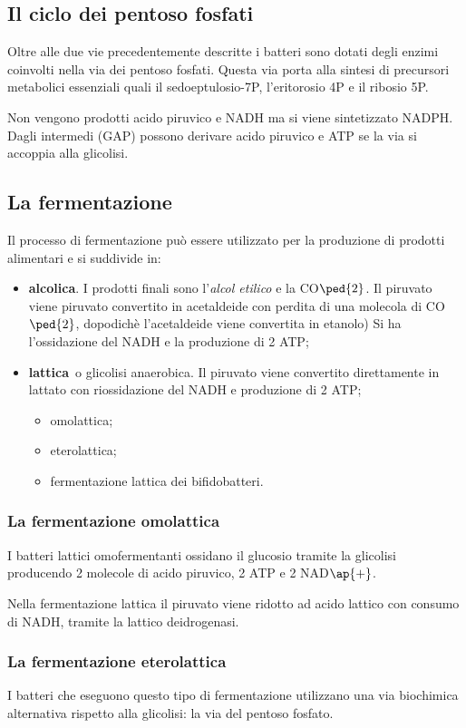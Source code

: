 \documentclass[11pt]{book}
\begin{document}
\subsection{Il ciclo dei pentoso fosfati}
Oltre alle due vie precedentemente descritte i batteri sono dotati degli enzimi coinvolti nella via dei pentoso fosfati. Questa via porta alla sintesi di precursori metabolici essenziali quali il sedoeptulosio-7P, l'eritorosio 4P e il ribosio 5P. 

Non vengono prodotti acido piruvico e NADH ma si viene sintetizzato NADPH. Dagli intermedi (GAP) possono derivare acido piruvico e ATP se la via si accoppia alla glicolisi.


\subsection{La fermentazione}
Il processo di fermentazione può essere utilizzato per la produzione di prodotti alimentari e si suddivide in: 
\begin{itemize}
\item \textbf{alcolica}. I prodotti finali sono l'\emph{alcol etilico} e  la CO$\ped{2}$. Il piruvato viene piruvato convertito in acetaldeide con perdita di una molecola di CO$\ped{2}$, dopodichè l'acetaldeide viene convertita in etanolo) Si ha l'ossidazione del NADH e la produzione di 2 ATP;
\item \textbf{lattica} o glicolisi anaerobica. Il piruvato viene convertito direttamente in lattato con riossidazione del NADH e produzione di 2 ATP; 
\begin{itemize}
\item omolattica;
\item eterolattica;
\item fermentazione lattica dei bifidobatteri.
\end{itemize}
\end{itemize}


\subsubsection{La fermentazione omolattica}
I batteri lattici omofermentanti ossidano il glucosio tramite la glicolisi producendo 2 molecole di acido piruvico, 2 ATP e 2 NAD$\ap{+}$.

Nella fermentazione lattica il piruvato viene ridotto ad acido lattico con consumo di NADH, tramite la lattico deidrogenasi.

\subsubsection{La fermentazione eterolattica}
I batteri che eseguono questo tipo di fermentazione utilizzano una via biochimica alternativa rispetto alla glicolisi: la via del pentoso fosfato. 
\end{document}
